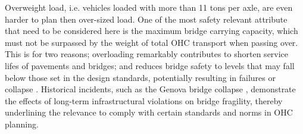 Overweight load, i.e. vehicles loaded with more than 11 tons per axle, are even harder to plan then over-sized load.
One of the most safety relevant attribute that need to be considered here is the maximum bridge carrying capacity, which must not be surpassed by the weight of total OHC transport when passing over.
This is for two reasons; overloading remarkably contributes to shorten service lifes of pavements and bridges; and reduces bridge safety to levels that may fall below those set in the design standards, potentially resulting in failures or collapse \cite{fiorillo2018fragility}.
Historical incidents, such as the Genova bridge collapse \cite{Morgese.2020, MorandiNYTimes},  demonstrate the effects of long-term infrastructural violations on bridge fragility, thereby underlining the relevance to comply with certain standards and norms in OHC planning.

